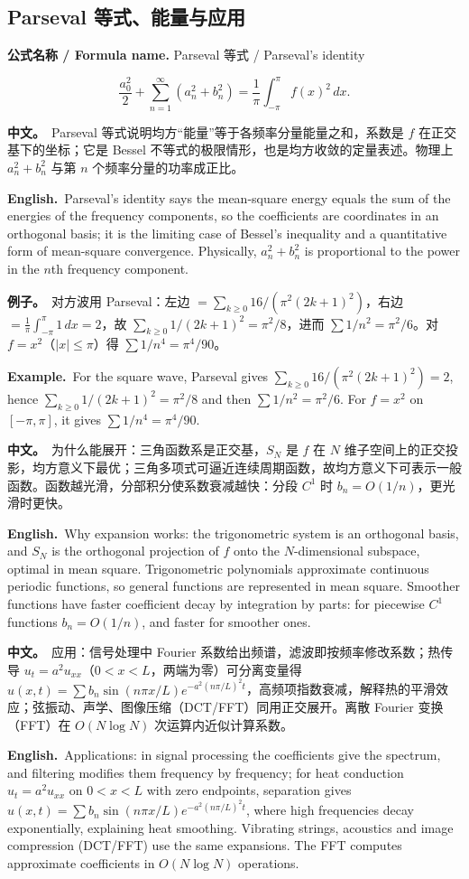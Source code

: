 \documentclass[UTF8,11pt,a4paper]{ctexart}
\newcommand{\BOTH}[2]{\par\noindent\textbf{中文。}\ #1\par\noindent\textbf{English.}\ #2\par}
\newcommand{\EX}[2]{\par\noindent\textbf{例子。}\ #1\par\noindent\textbf{Example.}\ #2\par}
\newcommand{\FORMULA}[2]{\par\noindent\textbf{公式名称 / Formula name.} #1 / #2\par}
\begin{document}
\subsection{Parseval 等式、能量与应用}
\FORMULA{Parseval 等式}{Parseval's identity}
\[
\frac{a_0^2}{2}+\sum_{n=1}^{\infty}(a_n^2+b_n^2)=\frac1\pi\int_{-\pi}^{\pi}f(x)^2\,dx .
\]
\BOTH{Parseval 等式说明均方“能量”等于各频率分量能量之和，系数是 $f$ 在正交基下的坐标；它是 Bessel 不等式的极限情形，也是均方收敛的定量表述。物理上 $a_n^2+b_n^2$ 与第 $n$ 个频率分量的功率成正比。}{Parseval's identity says the mean-square energy equals the sum of the energies of the frequency components, so the coefficients are coordinates in an orthogonal basis; it is the limiting case of Bessel's inequality and a quantitative form of mean-square convergence. Physically, $a_n^2+b_n^2$ is proportional to the power in the $n$th frequency component.}
\EX{对方波用 Parseval：左边 $=\sum_{k\ge0}16/(\pi^2(2k+1)^2)$，右边 $=\frac1\pi\int_{-\pi}^{\pi}1\,dx=2$，故 $\sum_{k\ge0}1/(2k+1)^2=\pi^2/8$，进而 $\sum1/n^2=\pi^2/6$。对 $f=x^2$（$|x|\le\pi$）得 $\sum1/n^4=\pi^4/90$。}{For the square wave, Parseval gives $\sum_{k\ge0}16/(\pi^2(2k+1)^2)=2$, hence $\sum_{k\ge0}1/(2k+1)^2=\pi^2/8$ and then $\sum1/n^2=\pi^2/6$. For $f=x^2$ on $[-\pi,\pi]$, it gives $\sum1/n^4=\pi^4/90$.}
\BOTH{为什么能展开：三角函数系是正交基，$S_N$ 是 $f$ 在 $N$ 维子空间上的正交投影，均方意义下最优；三角多项式可逼近连续周期函数，故均方意义下可表示一般函数。函数越光滑，分部积分使系数衰减越快：分段 $C^1$ 时 $b_n=O(1/n)$，更光滑时更快。}{Why expansion works: the trigonometric system is an orthogonal basis, and $S_N$ is the orthogonal projection of $f$ onto the $N$-dimensional subspace, optimal in mean square. Trigonometric polynomials approximate continuous periodic functions, so general functions are represented in mean square. Smoother functions have faster coefficient decay by integration by parts: for piecewise $C^1$ functions $b_n=O(1/n)$, and faster for smoother ones.}
\BOTH{应用：信号处理中 Fourier 系数给出频谱，滤波即按频率修改系数；热传导 $u_t=a^2u_{xx}$（$0<x<L$，两端为零）可分离变量得 $u(x,t)=\sum b_n\sin(n\pi x/L)e^{-a^2(n\pi/L)^2t}$，高频项指数衰减，解释热的平滑效应；弦振动、声学、图像压缩（DCT/FFT）同用正交展开。离散 Fourier 变换（FFT）在 $O(N\log N)$ 次运算内近似计算系数。}{Applications: in signal processing the coefficients give the spectrum, and filtering modifies them frequency by frequency; for heat conduction $u_t=a^2u_{xx}$ on $0<x<L$ with zero endpoints, separation gives $u(x,t)=\sum b_n\sin(n\pi x/L)e^{-a^2(n\pi/L)^2t}$, where high frequencies decay exponentially, explaining heat smoothing. Vibrating strings, acoustics and image compression (DCT/FFT) use the same expansions. The FFT computes approximate coefficients in $O(N\log N)$ operations.}
\end{document}
